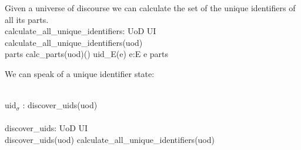 \label{All Unique Identifiers of a Domain}

\begynd
\pind Given a universe of discourse we can calculate \nyl the set of the
      unique identifiers of all its parts.
\bp
{}\\
\>\>calculate\_all\_unique\_identifiers: UoD {\RIGHTARROW} UI\\
\>\>calculate\_all\_unique\_identifiers(uod) {\IS}\\
\>\>\>\> parts {\EQ} calc\_parts({\LBRACE}uod{\RBRACE})({\LBRACE}{\RBRACE})  {\LBRACE} uid\_E(e) {\BAR} e:E {\RDOT} e {\ISIN} parts {\RBRACE} 
\ep
\afslut


\mnewfoil\label{kap4.The Unique Identifier State}\label{all-uniq-ids}

\noindent
\begynd
\pind We can speak of a unique identifier state:
\afslut

\bp
\>\ \\
\>\>\>uid$_{\sigma}$ :{\EQ} discover\_uids(uod)\\
\>\ \\
\>\>\>discover\_uids: UoD {\RIGHTARROW} UI\\
\>\>\>discover\_uids(uod) {\IS} calculate\_all\_unique\_identifiers(uod)
\ep

